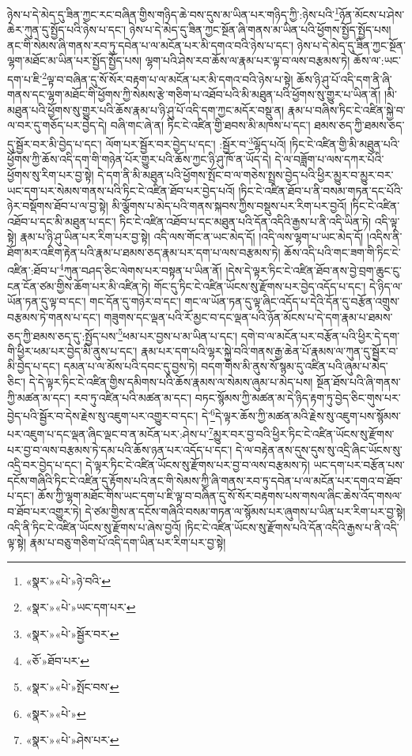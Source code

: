 ཉེས་པ་དེ་མེད་དུ་ཟིན་ཀྱང་རང་བཞིན་གྱིས་གཉིད་ཆེ་བས་དུས་མ་ཡིན་པར་གཉིད་ཀྱི་:ཉེས་པའི་\footnote{«སྣར་»«པེ་»ཉེ་བའི་}ཉོན་མོངས་པ་ཤེས་ཆེར་ཀུན་དུ་སྤྱོད་པའི་ཉེས་པ་དང་། ཉེས་པ་དེ་མེད་དུ་ཟིན་ཀྱང་སྔོན་ཞི་གནས་མ་ཡིན་པའི་ཕྱོགས་སྤྱོད་སྤྱོད་པས། ནང་གི་སེམས་ཞི་གནས་རབ་ཏུ་དབེན་པ་ལ་མངོན་པར་མི་དགའ་བའི་ཉེས་པ་དང་། ཉེས་པ་དེ་མེད་དུ་ཟིན་ཀྱང་སྔོན་ལྷག་མཐོང་མ་ཡིན་པར་སྤྱོད་སྤྱོད་པས། ལྷག་པའི་ཤེས་རབ་ཆོས་ལ་རྣམ་པར་ལྟ་བ་ལས་བརྩམས་ཏེ། ཆོས་ལ་:ཡང་དག་པ་ཇི་\footnote{«སྣར་»«པེ་»ཡང་དག་པར་}ལྟ་བ་བཞིན་དུ་སོ་སོར་བརྟག་པ་ལ་མངོན་པར་མི་དགའ་བའི་ཉེས་པ་སྟེ། ཆོས་ཉི་ཤུ་པོ་འདི་དག་ནི་ཞི་གནས་དང་ལྷག་མཐོང་གི་ཕྱོགས་ཀྱི་སེམས་རྩེ་གཅིག་པ་འཐོབ་པའི་མི་མཐུན་པའི་ཕྱོགས་སུ་གྱུར་པ་ཡིན་ནོ། །མི་མཐུན་པའི་ཕྱོགས་སུ་གྱུར་པའི་ཆོས་རྣམ་པ་ཉི་ཤུ་པོ་འདི་དག་ཀྱང་མདོར་བསྡུ་ན། རྣམ་པ་བཞིས་ཏིང་ངེ་འཛིན་སྐྱེ་བ་ལ་བར་དུ་གཅོད་པར་བྱེད་དེ། བཞི་གང་ཞེ་ན། ཏིང་ངེ་འཛིན་གྱི་ཐབས་མི་མཁས་པ་དང་། ཐམས་ཅད་ཀྱི་ཐམས་ཅད་དུ་སྦྱོར་བར་མི་བྱེད་པ་དང་། ལོག་པར་སྦྱོར་བར་བྱེད་པ་དང་། :སྦྱོར་བ་\footnote{«སྣར་»«པེ་»སྦྱོར་བར་}ལྷོད་པའོ། །ཏིང་ངེ་འཛིན་གྱི་མི་མཐུན་པའི་ཕྱོགས་ཀྱི་ཆོས་འདི་དག་གི་གཉེན་པོར་གྱུར་པའི་ཆོས་ཀྱང་ཉི་ཤུ་ཁོ་ན་ཡོད་དེ། དེ་ལ་བཟློག་པ་ལས་དཀར་པོའི་ཕྱོགས་སུ་རིག་པར་བྱ་སྟེ། དེ་དག་ནི་མི་མཐུན་པའི་ཕྱོགས་སྤོང་བ་ལ་གཅེས་སྤྲས་བྱེད་པའི་ཕྱིར་མྱུར་བ་མྱུར་བར་ཡང་དག་པར་སེམས་གནས་པའི་ཏིང་ངེ་འཛིན་ཐོབ་པར་བྱེད་པའོ། །ཏིང་ངེ་འཛིན་ཐོབ་པ་ནི་བསམ་གཏན་དང་པོའི་ཉེར་བསྡོགས་ཐོབ་པ་ལ་བྱ་སྟེ། མི་ལྕོགས་པ་མེད་པའི་གནས་སྐབས་ཀྱིས་བསྡུས་པར་རིག་པར་བྱའོ། །ཏིང་ངེ་འཛིན་འཐོབ་པ་དང་མི་མཐུན་པ་དང་། ཏིང་ངེ་འཛིན་འཐོབ་པ་དང་མཐུན་པའི་དོན་འདིའི་རྒྱས་པ་ནི་འདི་ཡིན་ཏེ། འདི་ལྟ་སྟེ། རྣམ་པ་ཉི་ཤུ་ཡིན་པར་རིག་པར་བྱ་སྟེ། འདི་ལས་གོང་ན་ཡང་མེད་དོ། །འདི་ལས་ལྷག་པ་ཡང་མེད་དོ། །འདིས་ནི་ཐོག་མར་འཇིག་རྟེན་པའི་རྣམ་པ་ཐམས་ཅད་རྣམ་པར་དག་པ་ལས་བརྩམས་ཏེ། ཆོས་འདི་པའི་གང་ཟག་གི་ཏིང་ངེ་འཛིན་:ཐོབ་པ་\footnote{«ཅོ་»ཐོབ་པར་}ཀུན་བཤད་ཅིང་ལེགས་པར་བསྟན་པ་ཡིན་ནོ། །དེས་དེ་ལྟར་ཏིང་ངེ་འཛིན་ཐོབ་ནས་བྱེ་བྲག་ཆུང་ངུ་ངན་ངོན་ཙམ་གྱིས་ཆོག་པར་མི་འཛིན་ཏེ། གོང་དུ་ཏིང་ངེ་འཛིན་ཡོངས་སུ་རྫོགས་པར་བྱེད་འདོད་པ་དང་། དེ་ཉིད་ལ་ཡོན་ཏན་དུ་ལྟ་བ་དང་། གང་དོན་དུ་གཉེར་བ་དང་། གང་ལ་ཡོན་ཏན་དུ་ལྟ་ཞིང་འདོད་པ་དེའི་དོན་དུ་བརྩོན་འགྲུས་བརྩམས་ཏེ་གནས་པ་དང་། གཟུགས་དང་ལྡན་པའི་རོ་མྱང་བ་དང་ལྡན་པའི་ཉོན་མོངས་པ་དེ་དག་རྣམ་པ་ཐམས་ཅད་ཀྱི་ཐམས་ཅད་དུ་:སྤྱོད་པས་\footnote{«སྣར་»«པེ་»སྤོང་བས་}ཕམ་པར་བྱས་པ་མ་ཡིན་པ་དང་། དགེ་བ་ལ་མངོན་པར་བརྩོན་པའི་ཕྱིར་དེ་དག་གི་ཕྱིར་ཕམ་པར་བྱེད་མི་ནུས་པ་དང་། རྣམ་པར་དག་པའི་ལྷར་སྐྱེ་བའི་གནས་རྒྱ་ཆེན་པོ་རྣམས་ལ་ཀུན་དུ་སྦྱོར་བ་མི་བྱེད་པ་དང་། དམན་པ་ལ་མོས་པའི་དབང་དུ་བྱས་ཏེ། བདག་གིས་མི་ནུས་སོ་སྙམ་དུ་འཛིན་པའི་ཞུམ་པ་མེད་ཅིང་། དེ་དེ་ལྟར་ཏིང་ངེ་འཛིན་གྱིས་དམིགས་པའི་ཆོས་རྣམས་ལ་སེམས་ཞུམ་པ་མེད་པས། སྔོན་ཐོས་པའི་ཞི་གནས་ཀྱི་མཚན་མ་དང་། རབ་ཏུ་འཛིན་པའི་མཚན་མ་དང་། བཏང་སྙོམས་ཀྱི་མཚན་མ་དེ་ཉིད་རྟག་ཏུ་བྱེད་ཅིང་གུས་པར་བྱེད་པའི་སྦྱོར་བ་དེས་རྗེས་སུ་འཇུག་པར་འགྱུར་བ་དང་། དེ་\footnote{«སྣར་»«པེ་»}དེ་ལྟར་ཆོས་ཀྱི་མཚན་མའི་རྗེས་སུ་འཇུག་པས་སྙོམས་པར་འཇུག་པ་དང་ལྡན་ཞིང་ལྡང་བ་ན་མངོན་པར་:ཤེས་པ་\footnote{«སྣར་»«པེ་»ཤེས་པར་}མྱུར་བར་བྱ་བའི་ཕྱིར་ཏིང་ངེ་འཛིན་ཡོངས་སུ་རྫོགས་པར་བྱ་བ་ལས་བརྩམས་ཏེ་དམ་པའི་ཆོས་ཉན་པར་འདོད་པ་དང་། དེ་ལ་བརྟེན་ནས་དུས་དུས་སུ་འདྲི་ཞིང་ཡོངས་སུ་འདྲི་བར་བྱེད་པ་དང་། དེ་ལྟར་ཏིང་ངེ་འཛིན་ཡོངས་སུ་རྫོགས་པར་བྱ་བ་ལས་བརྩམས་ཏེ། ཡང་དག་པར་བརྩོན་པས་དངོས་གཞིའི་ཏིང་ངེ་འཛིན་དུ་རྟོགས་པའི་ནང་གི་སེམས་ཀྱི་ཞི་གནས་རབ་ཏུ་དབེན་པ་ལ་མངོན་པར་དགའ་བ་ཐོབ་པ་དང་། ཆོས་ཀྱི་ལྷག་མཐོང་གིས་ཡང་དག་པ་ཇི་ལྟ་བ་བཞིན་དུ་སོ་སོར་བརྟགས་པས་གསལ་ཞིང་ཆེས་འོད་གསལ་བ་ཐོབ་པར་འགྱུར་ཏེ། དེ་ཙམ་གྱིས་ན་དངོས་གཞིའི་བསམ་གཏན་ལ་སྙོམས་པར་ཞུགས་པ་ཡིན་པར་རིག་པར་བྱ་སྟེ། འདི་ནི་ཏིང་ངེ་འཛིན་ཡོངས་སུ་རྫོགས་པ་ཞེས་བྱའོ། །ཏིང་ངེ་འཛིན་ཡོངས་སུ་རྫོགས་པའི་དོན་འདིའི་རྒྱས་པ་ནི་འདི་ལྟ་སྟེ། རྣམ་པ་བཅུ་གཅིག་པོ་འདི་དག་ཡིན་པར་རིག་པར་བྱ་སྟེ། 